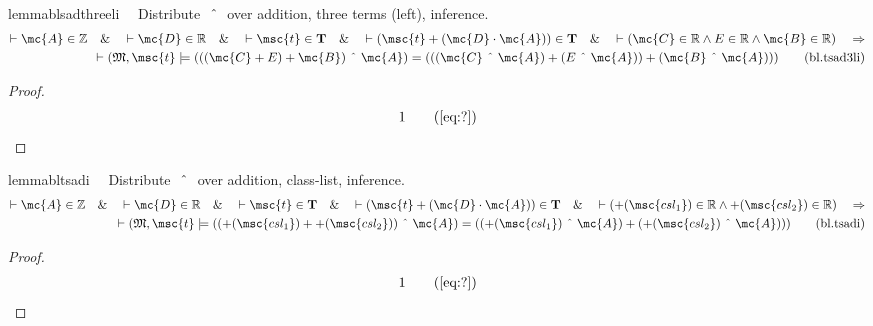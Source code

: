 \begin{restatable}{lemma}{blsadthreeli}~~ Distribute $~\string^~$ over addition,
three terms (left), inference.
\begin{align}
\vdash \mc{A} \in \mathbb{Z}\quad\&\quad \vdash \mc{D} \in
    \mathbb{R}\quad\&\quad \vdash \msc{t} \in \mathbf{T}\quad\&\quad \vdash (
    \msc{t} + ( \mc{D} \cdot \mc{A} ) ) \in \mathbf{T}\quad\&\quad \vdash (
    \mc{C} \in \mathbb{R} \wedge E \in \mathbb{R} \wedge \mc{B} \in \mathbb{R}
    )\quad\Rightarrow \notag \\ 
	\quad \vdash ( \mathfrak{M} , \msc{t} \models ( ( ( \mc{C}
    + E ) + \mc{B} ) ~\string^~ \mc{A} ) = ( ( ( \mc{C} ~\string^~ \mc{A} ) + (
    E ~\string^~ \mc{A} ) ) + ( \mc{B} ~\string^~ \mc{A} ) )
    )\label{eq:bl.tsad3li}\tag{bl.tsad3li}
\end{align}
\end{restatable}

\begin{proof}
\begin{align}
  1 &&  & &(\mbox{\ref{eq:?}})\notag
\end{align}
\end{proof}

\begin{restatable}{lemma}{bltsadi}~~ Distribute $~\string^~$ over addition,
class-list, inference.
\begin{align}
\vdash \mc{A} \in \mathbb{Z}\quad\&\quad \vdash \mc{D} \in
    \mathbb{R}\quad\&\quad \vdash \msc{t} \in \mathbf{T}\quad\&\quad \vdash (
    \msc{t} + ( \mc{D} \cdot \mc{A} ) ) \in \mathbf{T}\quad\&\quad \vdash ( +(
    \msc{csl_1} ) \in \mathbb{R} \wedge +( \msc{csl_2} ) \in \mathbb{R}
    )\quad\Rightarrow \notag \\ 
	\quad \vdash ( \mathfrak{M} , \msc{t} \models ( ( +(
    \msc{csl_1} ) + +( \msc{csl_2} ) ) ~\string^~ \mc{A} ) = ( ( +( \msc{csl_1}
    ) ~\string^~ \mc{A} ) + ( +( \msc{csl_2} ) ~\string^~ \mc{A} ) )
    )\label{eq:bl.tsadi}\tag{bl.tsadi}
\end{align}
\end{restatable}

\begin{proof}
\begin{align}
  1 &&  & &(\mbox{\ref{eq:?}})\notag
\end{align}
\end{proof}


